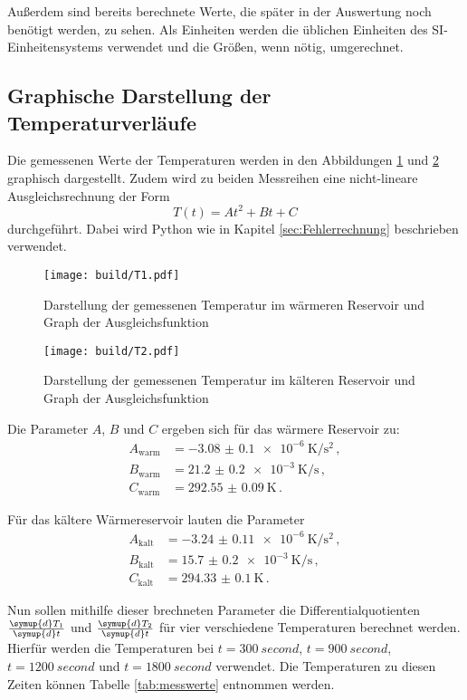 Außerdem sind bereits berechnete Werte,
die später in der Auswertung noch benötigt werden, zu sehen. Als Einheiten werden
die üblichen Einheiten des SI-Einheitensystems verwendet und die Größen, wenn nötig,
umgerechnet.

\subsection{Graphische Darstellung der Temperaturverläufe}
Die gemessenen Werte der Temperaturen werden in den Abbildungen \ref{fig:temp1} und \ref{fig:temp2}
graphisch dargestellt. Zudem wird zu beiden Messreihen eine nicht-lineare
Ausgleichsrechnung der Form
\begin{equation}
  T(t)=At^2+Bt+C
\end{equation}
durchgeführt. Dabei wird Python wie in Kapitel \ref{sec:Fehlerrechnung} beschrieben
verwendet.

\begin{figure}
  \centering
  \texttt{[image: build/T1.pdf]}
  \caption{Darstellung der gemessenen Temperatur im wärmeren Reservoir
   und Graph der Ausgleichsfunktion}
  \label{fig:temp1}
\end{figure}

\begin{figure}
  \centering
  \texttt{[image: build/T2.pdf]}
  \caption{Darstellung der gemessenen Temperatur im kälteren Reservoir
   und Graph der Ausgleichsfunktion}
  \label{fig:temp2}
\end{figure}

Die Parameter $A$, $B$ und $C$ ergeben sich für das wärmere Reservoir zu:
\begin{align*}
  A_\text{warm}&=\SI{-3.08(010)e-6}{\kelvin\per\second\squared}  \,, \\
  B_\text{warm}&=\SI{21.2(02)e-3}{\kelvin\per\second} \,,  \\
  C_\text{warm}&=\SI{292.55(009)}{\kelvin}  \,.
\end{align*}

Für das kältere Wärmereservoir lauten die Parameter
\begin{align*}
  A_\text{kalt}&=\SI{-3.24(011)e-6}{\kelvin\per\second\squared}  \,, \\
  B_\text{kalt}&=\SI{15.7(02)e-3}{\kelvin\per\second} \,,  \\
  C_\text{kalt}&=\SI{294.33(010)}{\kelvin}  \,.
\end{align*}



Nun sollen mithilfe dieser brechneten Parameter die Differentialquotienten
$\frac{\symup{d}T_1}{\symup{d}t}$ und $\frac{\symup{d}T_2}{\symup{d}t}$ für
vier verschiedene Temperaturen berechnet werden. Hierfür werden die Temperaturen
bei $t=\SI{300}{second}$, $t=\SI{900}{second}$, $t=\SI{1200}{second}$ und
$t=\SI{1800}{second}$ verwendet. Die Temperaturen zu diesen Zeiten können Tabelle
\ref{tab:messwerte} entnommen werden.

